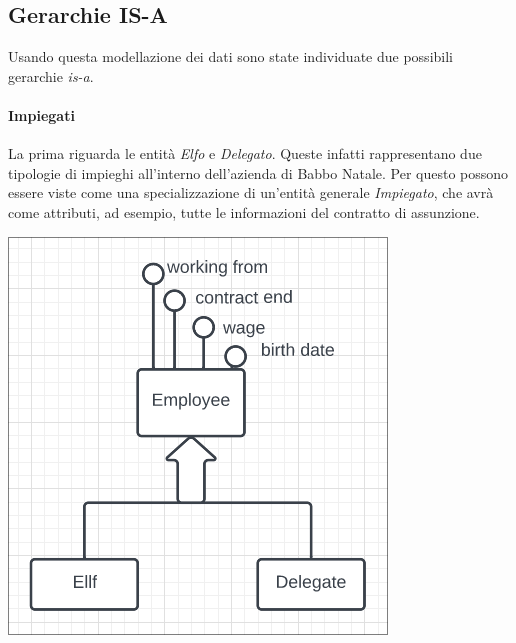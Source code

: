 \documentclass[12pt]{report}
\begin{document}
\subsection{Gerarchie IS-A}
Usando questa modellazione dei dati sono state individuate due possibili 
gerarchie \textit{is-a}.

\paragraph{Impiegati}
La prima riguarda le entità \textit{Elfo} e \textit{Delegato}. Queste infatti
rappresentano due tipologie di impieghi all'interno dell'azienda di Babbo Natale.
Per questo possono essere viste come una specializzazione di un'entità generale
\textit{Impiegato}, che avrà come attributi, ad esempio, tutte le informazioni 
del contratto di assunzione.
\begin{center}
\includegraphics[scale=0.50]{isa1.png}
\end{center}
\end{document}
